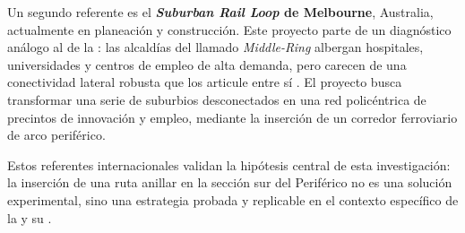 Un segundo referente es el \textbf{\textit{Suburban Rail Loop} de Melbourne},
Australia, actualmente en planeación y construcción. Este proyecto parte de un
diagnóstico análogo al de la \cdmx{}: las alcaldías del llamado
\textit{Middle-Ring}
albergan hospitales, universidades y centros de empleo de alta demanda, pero
carecen de una conectividad lateral robusta que los articule entre sí
\citep{suburbanrailloop2021}. El proyecto busca transformar una serie de
suburbios desconectados en una red policéntrica de precintos de innovación y
empleo, mediante la inserción de un corredor ferroviario de arco periférico.

Estos referentes internacionales validan la hipótesis central de esta
investigación:
la inserción de una ruta anillar en la sección sur del Periférico no es una
solución
experimental, sino una estrategia probada y replicable en el contexto específico
de
la \cdmx{} y su \zmvm{}.